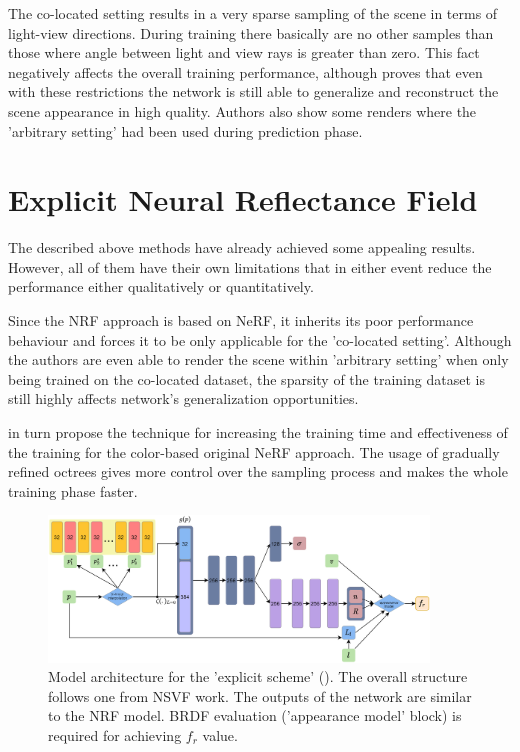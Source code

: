 The co-located setting results in a very sparse sampling of the scene in terms of light-view directions.
During training there basically are no other samples than those
where angle between light and view rays is greater than zero.
This fact negatively affects the overall training performance,
although \cite{bi2020neural} proves that even with these restrictions
the network is still able to generalize and reconstruct the scene appearance in high quality.
Authors also show some renders where the 'arbitrary setting' had been used during prediction phase.





\section{Explicit Neural Reflectance Field}
\label{sec:explicit_scheme}

The described above methods have already achieved some appealing results.
However, all of them have their own limitations that in either event reduce the performance either qualitatively or quantitatively.

Since the NRF approach \cite{bi2020neural} is based on NeRF, it inherits its poor performance behaviour
and forces it to be only applicable for the 'co-located setting'.
Although the authors are even able to render the scene within 'arbitrary setting'
when only being trained on the co-located dataset,
the sparsity of the training dataset is still highly affects network's generalization opportunities.

\cite{liu2021neural} in turn propose the technique for increasing the training time and effectiveness of the training
for the color-based original NeRF approach.
The usage of gradually refined octrees gives more control over the sampling process
and makes the whole training phase faster.

\begin{figure}[t]
    \centering
    \includegraphics[width=0.9\textwidth]{figures/explicit_scheme.png}
    \caption{Model architecture for the 'explicit scheme'
    ().
The overall structure follows one from NSVF work.
The outputs of the network are similar to the NRF model.
BRDF evaluation ('appearance model' block) is required for achieving $f_r$ value.
    }
    \label{fig:mlnrf_bfex}
\end{figure}


